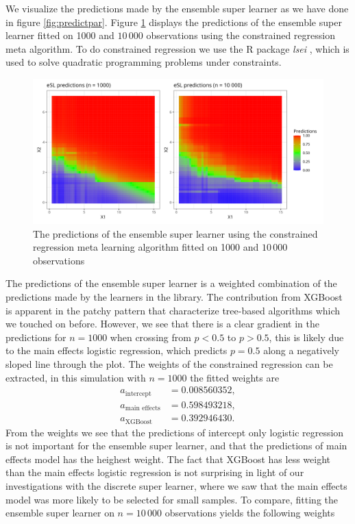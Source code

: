 \documentclass[./main.tex]{subfiles}
\begin{document}
We visualize the predictions made by the ensemble super learner as we have done in figure \ref{fig:predictpar}. Figure \ref{fig:esl_preds_quad_prog} displays the predictions of the ensemble super learner fitted on 1000 and $ 10\,000 $ observations using the constrained regression meta algorithm. To do constrained regression we use the R package \textit{lsei} \parencite{lsei}, which is used to solve quadratic programming problems under constraints.  
\begin{figure}[H]
    \centering
    \includegraphics[width=\textwidth]{figures/esl_preds_par.png}
    \caption{The predictions of the ensemble super learner using the constrained regression meta learning algorithm fitted on 1000 and $ 10\,000 $ observations}
    \label{fig:esl_preds_quad_prog}
\end{figure}
The predictions of the ensemble super learner is a weighted combination of the predictions made by the learners in the library. The contribution from XGBoost is apparent in the patchy pattern that characterize tree-based algorithms which we touched on before. However, we see that there is a clear gradient in the predictions for $ n = 1000 $ when crossing from $ p < 0.5 $ to $ p > 0.5 $, this is likely due to the main effects logistic regression, which predicts $ p = 0.5 $ along a negatively sloped line through the plot. The weights of the constrained regression can be extracted, in this simulation with $ n = 1000 $ the fitted weights are
\begin{align*}
    a_{\text{intercept}} &=0.008560352, \\
    a_{\text{main effects}} &= 0.598493218, \\
    a_{\text{XGBoost}} &= 0.392946430.
\end{align*}
From the weights we see that the predictions of intercept only logistic regression is not important for the ensemble super learner, and that the predictions of main effects model has the heighest weight. The fact that XGBoost has less weight than the main effects logistic regression is not surprising in light of our investigations with the discrete super learner, where we saw that the main effects model was more likely to be selected for small samples. To compare, fitting the ensemble super learner on $ n = 10\,000 $ observations yields the following weights
\end{document}
